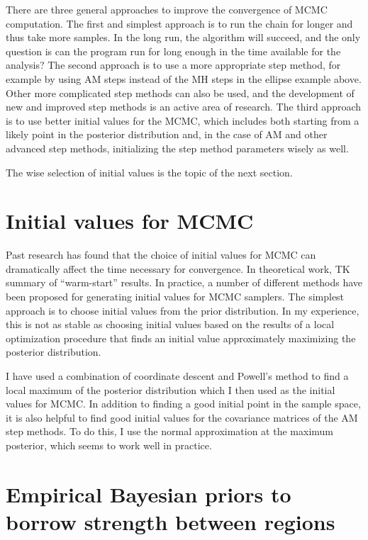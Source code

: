 There are three general approaches to improve the convergence of MCMC
computation. The first and simplest approach is to run the chain for
longer and thus take more samples.  In the long run, the algorithm
will succeed, and the only question is can the program run for long
enough in the time available for the analysis? The second approach is
to use a more appropriate step method, for example by using AM steps
instead of the MH steps in the ellipse example above.  Other more
complicated step methods can also be used, and the development of new
and improved step methods is an active area of research.  The third
approach is to use better initial values for the MCMC, which includes
both starting from a likely point in the posterior distribution and,
in the case of AM and other advanced step methods, initializing the
step method parameters wisely as well.

The wise selection of initial values is the topic of the next section.

\section{Initial values for MCMC}
Past research has found that the choice of initial values for MCMC can
dramatically affect the time necessary for convergence.  In
theoretical work, TK summary of ``warm-start''
results.\cite{Hit_and_run_papers} In practice, a number of different
methods have been proposed for generating initial values for MCMC
samplers.\cite{Gelman_Rubin_1992a,
  Applegate_Kannan_Polson_1990,Jennison_1993,Brooks_Gelman,Brooks_1998}
The simplest approach is to choose initial values from the prior
distribution.  In my experience, this is not as stable as choosing
initial values based on the results of a local optimization procedure
that finds an initial value approximately maximizing the posterior
distribution.

I have used a combination of coordinate descent and Powell's method to
find a local maximum of the posterior distribution which I then used
as the initial values for
MCMC.\cite{Tseng_Convergence_2001,Powell_An_1964} In addition to
finding a good initial point in the sample space, it is also helpful
to find good initial values for the covariance matrices of the AM step
methods.  To do this, I use the normal approximation at the maximum
posterior, which seems to work well in practice.


\section{Empirical Bayesian priors to borrow strength between regions}
\label{empirical-priors}

